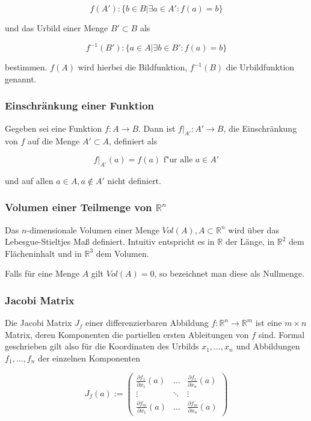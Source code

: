 \documentclass[a4paper,fontsize=12pt,toc=bib,halfparskip]{scrartcl}
\begin{document}
\begin{equation}
	f(A'): \{ b \in B | \exists a \in A' : f(a) = b \}
\end{equation}

und das Urbild einer Menge $B' \subset B$ als

\begin{equation}
	f^{-1}(B'): \{ a \in A | \exists b \in B' : f(a) = b\}
\end{equation}

bestimmen. $f(A)$ wird hierbei die Bildfunktion, $f^{-1}(B)$ die Urbildfunktion genannt. 

\subsubsection{Einschr\"ankung einer Funktion}
Gegeben sei eine Funktion $f: A \rightarrow B$. Dann ist $f|_{A'}: A' \rightarrow B$, die Einschr\"ankung von $f$ auf die Menge $A' \subset A$, definiert als 

\begin{equation}
	f|_{A'}(a) = f(a) \text{ f"ur alle } a \in A'
\end{equation}

und auf allen $a \in A, a \notin A'$ nicht definiert. 

\subsubsection{Volumen einer Teilmenge von $\mathbb{R}^n$}
Das $n$-dimensionale Volumen einer Menge $Vol(A), A \subset \mathbb{R}^n$ wird \"uber das Lebesgue-Stieltjes Ma{\ss} definiert\cite{kusolitsch2014mass}. Intuitiv entspricht es in $\mathbb{R}$ der L\"ange, in $\mathbb{R}^2$ dem Fl\"acheninhalt und in $\mathbb{R}^3$ dem Volumen.

Falls f\"ur eine Menge $A$ gilt $Vol(A)=0$, so bezeichnet man diese als Nullmenge.

\subsubsection{Jacobi Matrix}
Die Jacobi Matrix $J_f$ einer differenzierbaren Abbildung $f: \mathbb{R}^n \rightarrow \mathbb{R}^m$ ist eine $m \times n$ Matrix, deren Komponenten die partiellen ersten Ableitungen von $f$ sind. Formal geschrieben gilt also f\"ur die Koordinaten des Urbilds $x_1, \dots, x_n$ und Abbildungen $f_1, ..., f_n$ der einzelnen Komponenten

\begin{equation}
	J_f(a) := 
	\begin{pmatrix}
		\frac{\partial f_1}{\partial x_1}(a) & \dots & \frac{\partial f_1}{\partial x_n}(a)  \\
		\vdots & \ddots & \vdots \\
		\frac{\partial f_m}{\partial x_1}(a) & \dots & \frac{\partial f_m}{\partial x_n}(a) 
	\end{pmatrix}
\end{equation}
\end{document}
